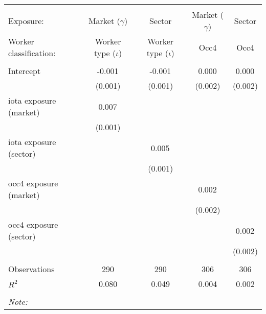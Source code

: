 \begin{tabular}{@{\extracolsep{5pt}}lcccc}
\\[-1.8ex]\hline
\hline \\[-1.8ex]
\hline \\[-1.8ex]
 Exposure: & Market ($\gamma$) & Sector & Market ($\gamma$) & Sector \\
 Worker classification: & Worker type ($\iota$) & Worker type ($\iota$) & Occ4 & Occ4 \\
 \hline &  &  &  &  \\
 Intercept & -0.001$^{}$ & -0.001$^{}$ & 0.000$^{}$ & 0.000$^{}$ \\
  & (0.001) & (0.001) & (0.002) & (0.002) \\
 iota exposure (market) & 0.007$^{}$ & & & \\
  & (0.001) & & & \\
 iota exposure (sector) & & 0.005$^{}$ & & \\
  & & (0.001) & & \\
 occ4 exposure (market) & & & 0.002$^{}$ & \\
  & & & (0.002) & \\
 occ4 exposure (sector) & & & & 0.002$^{}$ \\
  & & & & (0.002) \\
\hline \\[-1.8ex]
 Observations & 290 & 290 & 306 & 306 \\
 $R^2$ & 0.080 & 0.049 & 0.004 & 0.002 \\
\hline
\hline \\[-1.8ex]
\textit{Note:}\end{tabular}